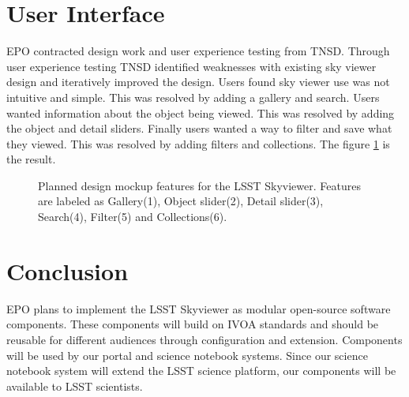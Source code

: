 \documentclass[11pt,twoside]{article}
\begin{document}
\section{User Interface}

EPO contracted design work and user experience testing from TNSD. Through user experience testing TNSD identified weaknesses with existing sky viewer design and iteratively improved the design. Users found sky viewer use was not intuitive and simple. This was resolved by adding a gallery and search. Users wanted information about the object being viewed. This was resolved by adding the object and detail sliders. Finally users wanted a way to filter and save what they viewed. This was resolved by adding filters and collections. The figure \ref{P1-140_fig1} is the result.
\begin{figure}[!ht]
  \caption{Planned design mockup features for the LSST Skyviewer. Features are labeled as Gallery(1), Object slider(2), Detail slider(3), Search(4), Filter(5) and Collections(6).}
  \label{P1-140_fig1}
\end{figure}



\section{Conclusion}
EPO plans to implement the LSST Skyviewer as modular open-source software components. These components will build on IVOA standards and should be reusable for different audiences through configuration and extension. Components will be used by our portal and science notebook systems. Since our science notebook system will extend the LSST science platform, our components will be available to LSST scientists.
\end{document}
